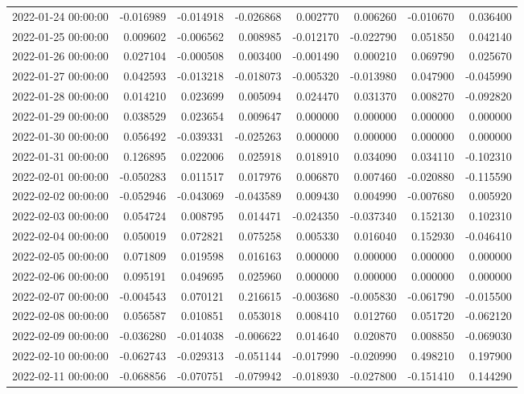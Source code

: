 \begin{tabular}{lrrrrrrr}
2022-01-24 00:00:00 & -0.016989 & -0.014918 & -0.026868 & 0.002770 & 0.006260 & -0.010670 & 0.036400 \\
2022-01-25 00:00:00 & 0.009602 & -0.006562 & 0.008985 & -0.012170 & -0.022790 & 0.051850 & 0.042140 \\
2022-01-26 00:00:00 & 0.027104 & -0.000508 & 0.003400 & -0.001490 & 0.000210 & 0.069790 & 0.025670 \\
2022-01-27 00:00:00 & 0.042593 & -0.013218 & -0.018073 & -0.005320 & -0.013980 & 0.047900 & -0.045990 \\
2022-01-28 00:00:00 & 0.014210 & 0.023699 & 0.005094 & 0.024470 & 0.031370 & 0.008270 & -0.092820 \\
2022-01-29 00:00:00 & 0.038529 & 0.023654 & 0.009647 & 0.000000 & 0.000000 & 0.000000 & 0.000000 \\
2022-01-30 00:00:00 & 0.056492 & -0.039331 & -0.025263 & 0.000000 & 0.000000 & 0.000000 & 0.000000 \\
2022-01-31 00:00:00 & 0.126895 & 0.022006 & 0.025918 & 0.018910 & 0.034090 & 0.034110 & -0.102310 \\
2022-02-01 00:00:00 & -0.050283 & 0.011517 & 0.017976 & 0.006870 & 0.007460 & -0.020880 & -0.115590 \\
2022-02-02 00:00:00 & -0.052946 & -0.043069 & -0.043589 & 0.009430 & 0.004990 & -0.007680 & 0.005920 \\
2022-02-03 00:00:00 & 0.054724 & 0.008795 & 0.014471 & -0.024350 & -0.037340 & 0.152130 & 0.102310 \\
2022-02-04 00:00:00 & 0.050019 & 0.072821 & 0.075258 & 0.005330 & 0.016040 & 0.152930 & -0.046410 \\
2022-02-05 00:00:00 & 0.071809 & 0.019598 & 0.016163 & 0.000000 & 0.000000 & 0.000000 & 0.000000 \\
2022-02-06 00:00:00 & 0.095191 & 0.049695 & 0.025960 & 0.000000 & 0.000000 & 0.000000 & 0.000000 \\
2022-02-07 00:00:00 & -0.004543 & 0.070121 & 0.216615 & -0.003680 & -0.005830 & -0.061790 & -0.015500 \\
2022-02-08 00:00:00 & 0.056587 & 0.010851 & 0.053018 & 0.008410 & 0.012760 & 0.051720 & -0.062120 \\
2022-02-09 00:00:00 & -0.036280 & -0.014038 & -0.006622 & 0.014640 & 0.020870 & 0.008850 & -0.069030 \\
2022-02-10 00:00:00 & -0.062743 & -0.029313 & -0.051144 & -0.017990 & -0.020990 & 0.498210 & 0.197900 \\
2022-02-11 00:00:00 & -0.068856 & -0.070751 & -0.079942 & -0.018930 & -0.027800 & -0.151410 & 0.144290 \\

\end{tabular}
